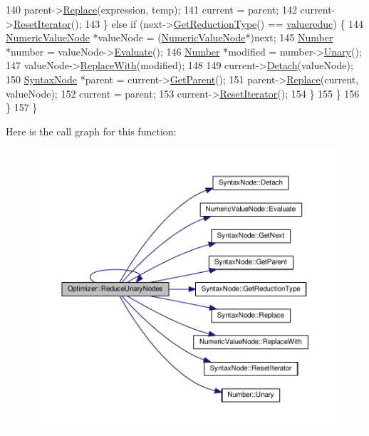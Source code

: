 \begin{DoxyCode}
140                 parent->\hyperlink{classSyntaxNode_a2797ff5eb05f3a36ae1be41b70105e05}{Replace}(expression, temp);
141                 current = parent;
142                 current->\hyperlink{classSyntaxNode_ac51307368fb255aa760b99e137178c89}{ResetIterator}();
143             \} \textcolor{keywordflow}{else} \textcolor{keywordflow}{if} (next->\hyperlink{classSyntaxNode_a5384fc779eee947b5e09bf2adb6cc606}{GetReductionType}() == \hyperlink{nodes_8h_ab321a69ad5704b704b8dd9e1b3984a29ab28eba4ada38a77030f8d532ee98a360}{valuereduc}) \{
144                 \hyperlink{classNumericValueNode}{NumericValueNode} *valueNode = (\hyperlink{classNumericValueNode}{NumericValueNode}*)next;
145                 \hyperlink{structNumber}{Number} *number = valueNode->\hyperlink{classNumericValueNode_abdd2e6fd1723488a24a645fec481a971}{Evaluate}();
146                 \hyperlink{structNumber}{Number} *modified = number->\hyperlink{structNumber_a4283e401f772614fc566db78087cf860}{Unary}();
147                 valueNode->\hyperlink{classNumericValueNode_ab46507560d70b5e4396f1f5fba5368ec}{ReplaceWith}(modified);
148 
149                 current->\hyperlink{classSyntaxNode_ae57f629a5c5fa0994f036c105396da69}{Detach}(valueNode);
150                 \hyperlink{classSyntaxNode}{SyntaxNode} *parent = current->\hyperlink{classSyntaxNode_a4a85fd710ad44edbc5b3ac625c10cd08}{GetParent}();
151                 parent->\hyperlink{classSyntaxNode_a2797ff5eb05f3a36ae1be41b70105e05}{Replace}(current, valueNode);
152                 current = parent;
153                 current->\hyperlink{classSyntaxNode_ac51307368fb255aa760b99e137178c89}{ResetIterator}();
154             \}
155         \}
156     \}
157 \}
\end{DoxyCode}


Here is the call graph for this function\+:
\nopagebreak
\begin{figure}[H]
\begin{center}
\leavevmode
\includegraphics[width=350pt]{d1/dc4/classOptimizer_aef8d80bb6301ee01a7ed271148438733_cgraph}
\end{center}
\end{figure}





